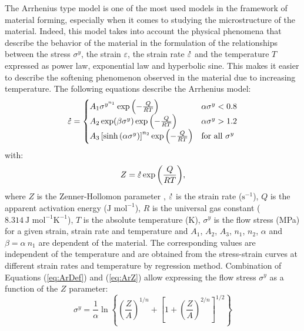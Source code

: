 \documentclass[twoside,english,1p,final,sort&compress]{elsarticle}
\theoremstyle{plain}
\DeclareRobustCommand{\mdot}[1]{\accentset{\mbox{\bfseries .}}{#1}}
\DeclareRobustCommand{\ps}{\text{s}^{-1}}
\begin{document}
The Arrhenius type model \cite{Sellars-1966} is one of the most used models in the framework of material forming, especially when it comes to studying the microstructure of the material.
Indeed, this model takes into account the physical phenomena that describe the behavior of the material in the formulation of the relationships between the stress $\sigma^y$, the strain $\varepsilon$, the strain rate $\mdot\varepsilon$ and the temperature $T$ expressed as power law, exponential law and hyperbolic sine.
This makes it easier to describe the softening phenomenon observed in the material due to increasing temperature.
The following equations describe the Arrhenius model:
\begin{equation}
\mdot\varepsilon =
\begin{cases}
A_1 \sigma^{y^{n_1}} \exp{\left(-\frac{Q}{RT}\right)} & \alpha\sigma^y < 0.8\\
A_2 \exp(\beta\sigma^y) \exp{\left(-\frac{Q}{RT}\right)} & \alpha\sigma^y > 1.2\\
A_3 \left[\sinh{\left(\alpha\sigma^y\right)}\right]^{n_2} \exp{\left(-\frac{Q}{RT}\right)} & \text{for all }\sigma^y
\end{cases}
\label{eq:ArDef}
\end{equation}
with:
\begin{equation}
Z = \mdot\varepsilon \exp{\left(\frac{Q}{RT}\right)}, \label{eq:ArZ}
\end{equation}
where $Z$ is the Zenner-Hollomon parameter \cite{Zener-1944}, $\mdot\varepsilon$ is the strain rate ($\ps$), $Q$ is the apparent activation energy ($\text{J~mol}^{-1}$), $R$ is the universal gas constant ($8.314~\text{J~mol}^{-1} \text{K}^{-1}$), $T$ is the absolute temperature (K), $\sigma^y$ is the flow stress (MPa) for a given strain, strain rate and temperature and $A_1$, $A_2$, $A_3$, $n_1$, $n_2$, $\alpha$ and $\beta=\alpha~n_1$ are dependent of the material.
The corresponding values are independent of the temperature and are obtained from the stress-strain curves at different strain rates and temperature by regression method.
Combination of Equations (\ref{eq:ArDef}) and (\ref{eq:ArZ}) allow expressing the flow stress $\sigma^y$ as a function of the $Z$ parameter:
\begin{equation}
\sigma^y = \frac{1}{\alpha} \ln\left\{\left(\frac{Z}{A}\right)^{1/n} + \left[1 + \left(\frac{Z}{A}\right)^{2/n}\right]^{1/2}\right\}
\end{equation}
\end{document}
